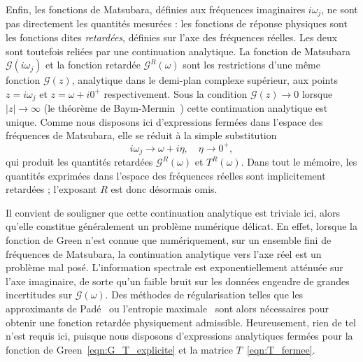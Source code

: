 Enfin, les fonctions de Matsubara, définies aux fréquences imaginaires $i\omega_j$, ne sont pas directement les quantités mesurées : les fonctions de réponse physiques sont les fonctions dites \emph{retardées}, définies sur l'axe des fréquences réelles. Les deux sont toutefois reliées par une continuation analytique. La fonction de Matsubara $\mathcal{G}(i\omega_j)$ et la fonction retardée $\mathcal{G}^R(\omega)$ sont les restrictions d'une même fonction $\mathcal{G}(z)$, analytique dans le demi-plan complexe supérieur, aux points $z=i\omega_j$ et $z=\omega+i0^+$ respectivement. Sous la condition $\mathcal{G}(z)\to 0$ lorsque $|z|\to \infty$ (le théorème de Baym-Mermin~\cite{baymDeterminationThermodynamicGreens1961}) cette continuation analytique est unique. Comme nous disposons ici d'expressions fermées dans l'espace des fréquences de Matsubara, elle se réduit à la simple substitution
\begin{equation}
    i\omega_j\to \omega+i\eta, \quad\eta \to 0^+,
\end{equation}
qui produit les quantités retardées $\mathcal{G}^R(\omega)$ et $T^R(\omega)$. Dans tout le mémoire, les quantités exprimées dans l'espace des fréquences réelles sont implicitement retardées ; l'exposant $R$ est donc désormais omis.

Il convient de souligner que cette continuation analytique est triviale ici, alors qu'elle constitue généralement un problème numérique délicat. En effet, lorsque la fonction de Green n'est connue que numériquement, sur un ensemble fini de fréquences de Matsubara, la continuation analytique vers l'axe réel est un problème mal posé. L'information spectrale est exponentiellement atténuée sur l'axe imaginaire, de sorte qu'un faible bruit sur les données engendre de grandes incertitudes sur $\mathcal{G}(\omega)$. Des méthodes de régularisation telles que les approximants de Padé~\cite{vidbergSolvingEliashbergEquations1977} ou l'entropie maximale~\cite{jarrellBayesianInferenceAnalytic1996} sont alors nécessaires pour obtenir une fonction retardée physiquement admissible. Heureusement, rien de tel n'est requis ici, puisque nous disposons d'expressions analytiques fermées pour la fonction de Green~\eqref{eqn:G_T_explicite} et la matrice $T$~\eqref{eqn:T_fermee}.
